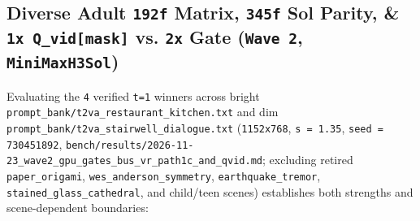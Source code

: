\documentclass[10pt]{article}
\begin{document}
\subsection{Diverse Adult \texttt{192f} Matrix, \texttt{345f} Sol Parity, \& \texttt{1x Q\_vid[mask]} vs. \texttt{2x} Gate (\texttt{Wave 2}, \texttt{MiniMaxH3Sol})}

Evaluating the \texttt{4} verified \texttt{t=1} winners across bright \texttt{prompt\_bank/t2va\_restaurant\_kitchen.txt} and dim \texttt{prompt\_bank/t2va\_stairwell\_dialogue.txt} (\texttt{1152x768}, \texttt{s = 1.35}, \texttt{seed = 730451892}, \texttt{bench/results/2026-11-23\_wave2\_gpu\_gates\_bus\_vr\_path1c\_and\_qvid.md}; excluding retired \texttt{paper\_origami}, \texttt{wes\_anderson\_symmetry}, \texttt{earthquake\_tremor}, \texttt{stained\_glass\_cathedral}, and child/teen scenes) establishes both strengths and scene-dependent boundaries:
\end{document}
